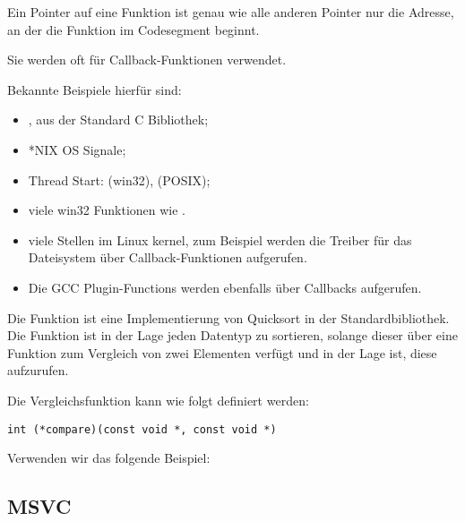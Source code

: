 \newcommand{\comp}{\TT{comp()}\xspace}
\label{sec:pointerstofunctions}

\myindex{\CLanguageElements!\Pointers}
Ein Pointer auf eine Funktion ist genau wie alle anderen Pointer nur die Adresse, an der die Funktion im Codesegment
beginnt.

Sie werden oft für Callback-Funktionen verwendet.

Bekannte Beispiele hierfür sind:

\begin{itemize}
\item \qsort,  aus der Standard C Bibliothek; 

\item *NIX OS Signale;

\item Thread Start:  (win32),  (POSIX);

\item viele win32 Funktionen wie .

\item viele Stellen im Linux kernel, zum Beispiel werden die Treiber für das Dateisystem über Callback-Funktionen
aufgerufen.

\item Die GCC Plugin-Functions werden ebenfalls über Callbacks aufgerufen.
\end{itemize}

Die Funktion \qsort ist eine Implementierung von Quicksort in der \CCpp Standardbibliothek.
Die Funktion ist in der Lage jeden Datentyp zu sortieren, solange dieser über eine Funktion zum Vergleich von zwei
Elementen verfügt und \qsort in der Lage ist, diese aufzurufen.

Die Vergleichsfunktion kann wie folgt definiert werden:

\begin{lstlisting}
int (*compare)(const void *, const void *)
\end{lstlisting}

Verwenden wir das folgende Beispiel:



\subsection{MSVC}

